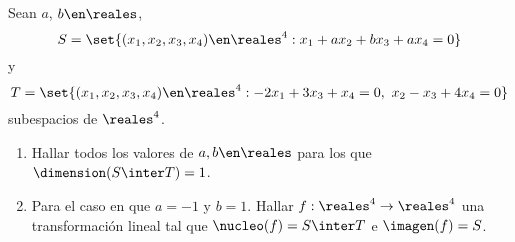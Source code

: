 \begin{enunciado}{\ejExtra}
  Sean $a$, $b \en \reales$,
  $$
    S = \set{(x_1,x_2,x_3,x_4) \en \reales^4 : x_1 + ax_2 + bx_3 + ax_4 = 0}
  $$
  y
  $$
    T = \set{(x_1,x_2,x_3,x_4) \en \reales^4 :
      -2x_1 + 3x_3 + x_4 = 0,\ 
      x_2 - x_3 + 4x_4 = 0}
  $$
  subespacios de $\reales^4$.
  \begin{enumerate}[label=\alph*)]
    \item Hallar todos los valores de $a, b \en \reales$ para los que $\dimension(S \inter T) = 1$.
    \item Para el caso en que $a = -1$ y $b = 1$. Hallar $f: \reales^4 \to \reales^4$ una transformación lineal
          tal que $\nucleo(f) = S \inter T$ e $\imagen(f) = S$.
  \end{enumerate}
\end{enunciado}

